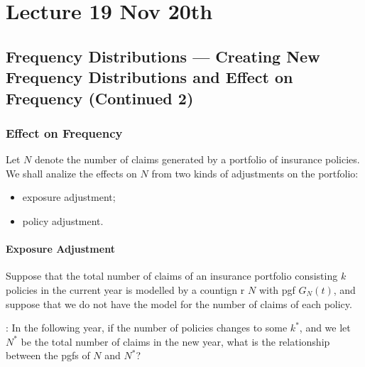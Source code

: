 \documentclass[notoc,notitlepage]{tufte-book}
\begin{document}


\chapter{Lecture 19 Nov 20th}%
\label{chp:lecture_19_nov_20th}

\section{Frequency Distributions --- Creating New Frequency Distributions and Effect on Frequency (Continued 2)}%
\label{sec:frequency_distributions_creating_new_frequency_distributions_and_effect_on_frequency_continued_2}

\subsection{Effect on Frequency}%
\label{sub:effect_on_frequency}

Let $N$ denote the number of claims generated by a portfolio of insurance policies. We shall analize the effects on $N$ from two kinds of adjustments on the portfolio:
\begin{itemize}
  \item exposure adjustment;
  \item policy adjustment.
\end{itemize}

\subsubsection{Exposure Adjustment}%
\label{ssub:exposure_adjustment}

Suppose that the total number of claims of an insurance portfolio consisting $k$ policies in the current year is modelled by a countign r $N$ with pgf $G_N(t)$, and suppose that we do not have the model for the number of claims of each policy.

: In the following year, if the number of policies changes to some $k^*$, and we let $N^*$ be the total number of claims in the new year, what is the relationship between the pgfs of $N$ and $N^*$?
\end{document}
